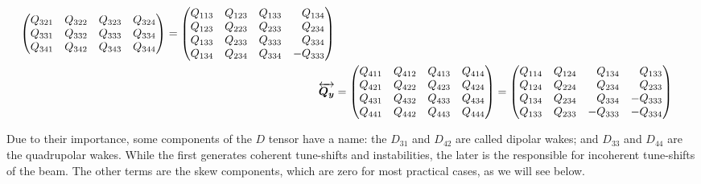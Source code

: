 \begin{apendicesenv}
\begin{align}
\begin{pmatrix*}[r]
                                   Q_{321} & Q_{322} & Q_{323} & Q_{324} \\
                                   Q_{331} & Q_{332} & Q_{333} & Q_{334} \\
                                   Q_{341} & Q_{342} & Q_{343} & Q_{344}
               \end{pmatrix*} =
               \begin{pmatrix*}[r] Q_{113} & Q_{123} & Q_{133} & Q_{134} \\
                                   Q_{123} & Q_{223} & Q_{233} & Q_{234} \\
                                   Q_{133} & Q_{233} & Q_{333} & Q_{334} \\
                                   Q_{134} & Q_{234} & Q_{334} & -Q_{333}
               \end{pmatrix*}\\
		\tensor{Q_y}&= \begin{pmatrix*}[r] Q_{411} & Q_{412} & Q_{413} & Q_{414} \\
                                   Q_{421} & Q_{422} & Q_{423} & Q_{424} \\
                                   Q_{431} & Q_{432} & Q_{433} & Q_{434} \\
                                   Q_{441} & Q_{442} & Q_{443} & Q_{444}
               \end{pmatrix*} =
               \begin{pmatrix*}[r] Q_{114} & Q_{124} & Q_{134} & Q_{133} \\
                                   Q_{124} & Q_{224} & Q_{234} & Q_{233} \\
                                   Q_{134} & Q_{234} & Q_{334} & -Q_{333} \\
                                   Q_{133} & Q_{233} &-Q_{333} & -Q_{334}
               \end{pmatrix*}\\
    \end{align}



    Due to their importance, some components of the $D$ tensor have a name: the $D_{31}$ and $D_{42}$ are called dipolar wakes; and $D_{33}$ and $D_{44}$ are the quadrupolar wakes. While the first generates coherent tune-shifts and instabilities, the later is the responsible for incoherent tune-shifts of the beam. The other terms are the skew components, which are zero for most practical cases, as we will see below.


\end{apendicesenv}
